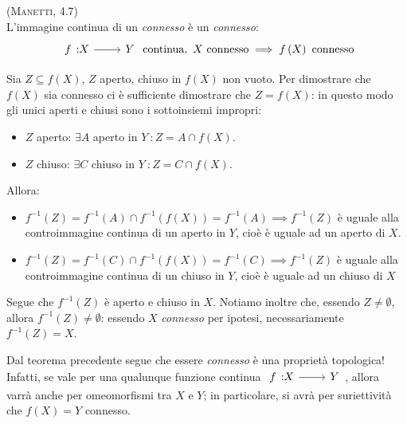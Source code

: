 \begin{theorema}\textsc{(Manetti, 4.7)}\\
	L'immagine continua di un \textit{connesso} è un \textit{connesso}:
	\begin{equation}
		\funz{f}{X}{Y}\text{ continua},\ X\text{ connesso}\implies f\left(X\right)\text{ connesso}
	\end{equation}
\vspace{-6mm}
\end{theorema}
\begin{theorema}
	Sia $Z\subseteq f\left(X\right)$, $Z$ aperto, chiuso in $f\left(X\right)$ non vuoto. Per dimostrare che $f\left(X\right)$ sia connesso ci è sufficiente dimostrare che $Z=f\left(X\right)$: in questo modo gli unici aperti e chiusi sono i sottoinsiemi impropri:
	\begin{itemize}
		\item $Z$ aperto: $\exists A$ aperto in $Y\ \colon Z=A\cap f\left(X\right)$.
		\item $Z$ chiuso: $\exists C$ chiuso in $Y\ \colon Z=C\cap f\left(X\right)$.
	\end{itemize}
Allora:
	\begin{itemize}
	\item $f^{-1}\left(Z\right)=f^{-1}\left(A\right)\cap f^{-1}\left(f\left(X\right)\right)=f^{-1}\left(A\right)\implies f^{-1}\left(Z\right)$ è uguale alla controimmagine continua di un aperto in $Y$, cioè è uguale ad un aperto di $X$.
	\item $f^{-1}\left(Z\right)=f^{-1}\left(C\right)\cap f^{-1}\left(f\left(X\right)\right)=f^{-1}\left(C\right)\implies f^{-1}\left(Z\right)$ è uguale alla controimmagine continua di un chiuso in $Y$, cioè è uguale ad un chiuso di $X$
	\end{itemize}
Segue che $f^{-1}\left(Z\right)$ è aperto e chiuso in $X$. Notiamo inoltre che, essendo $Z\neq \emptyset$, allora $f^{-1}\left(Z\right)\neq \emptyset$: essendo $X$ \textit{connesso} per ipotesi, necessariamente $f^{-1}\left(Z\right)=X$.
\end{theorema}
\begin{observe}
Dal teorema precedente segue che essere \textit{connesso} è una proprietà topologica! Infatti, se vale per una qualunque funzione continua $\funz{f}{X}{Y}$, allora varrà anche per omeomorfismi tra $X$ e $Y$; in particolare, si avrà per suriettività che $f\left(X\right)=Y$ connesso.
\end{observe}
